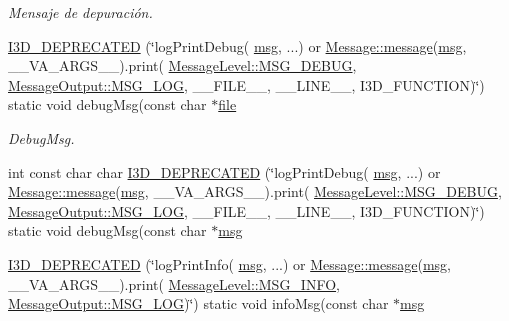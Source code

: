 \begin{DoxyCompactItemize}
\begin{DoxyCompactList}\small\item\em Mensaje de depuración. \end{DoxyCompactList}\item 
\hyperlink{class_i3_d_1_1_log_msg_a17cce8fb482ad6bcfc0f3accd5d1a33b}{I3\+D\+\_\+\+D\+E\+P\+R\+E\+C\+A\+T\+ED} (\char`\"{}log\+Print\+Debug( \hyperlink{class_i3_d_1_1_log_msg_a5a1ceb27d9529de8eb9b3fc9377e178a}{msg}, ...) or \hyperlink{class_i3_d_1_1_message_a525f877a41a1e7493188b2b720d1d254}{Message\+::message}(\hyperlink{class_i3_d_1_1_log_msg_a5a1ceb27d9529de8eb9b3fc9377e178a}{msg}, \+\_\+\+\_\+\+V\+A\+\_\+\+A\+R\+G\+S\+\_\+\+\_\+).print( \hyperlink{namespace_i3_d_a994cd716e000a4023e180dcdb9b3a9c0a918e87a1f80863c7ee35bfa2c58cc41e}{Message\+Level\+::\+M\+S\+G\+\_\+\+D\+E\+B\+UG}, \hyperlink{namespace_i3_d_accba1eafa248ca79da818a0b72e60964a8c1a4761ebfadb227927517230ff7b02}{Message\+Output\+::\+M\+S\+G\+\_\+\+L\+OG}, \+\_\+\+\_\+\+F\+I\+L\+E\+\_\+\+\_\+, \+\_\+\+\_\+\+L\+I\+N\+E\+\_\+\+\_\+, I3\+D\+\_\+\+F\+U\+N\+C\+T\+I\+ON)\char`\"{}) static void debug\+Msg(const char $\ast$\hyperlink{class_i3_d_1_1_log_msg_ab59f20d39ef112d2196371ae0636d77c}{file}
\begin{DoxyCompactList}\small\item\em Debug\+Msg. \end{DoxyCompactList}\item 
int const char char \hyperlink{class_i3_d_1_1_log_msg_a4bb9bcc06243caa8745dd7e4dda702e0}{I3\+D\+\_\+\+D\+E\+P\+R\+E\+C\+A\+T\+ED} (\char`\"{}log\+Print\+Debug( \hyperlink{class_i3_d_1_1_log_msg_a5a1ceb27d9529de8eb9b3fc9377e178a}{msg}, ...) or \hyperlink{class_i3_d_1_1_message_a525f877a41a1e7493188b2b720d1d254}{Message\+::message}(\hyperlink{class_i3_d_1_1_log_msg_a5a1ceb27d9529de8eb9b3fc9377e178a}{msg}, \+\_\+\+\_\+\+V\+A\+\_\+\+A\+R\+G\+S\+\_\+\+\_\+).print( \hyperlink{namespace_i3_d_a994cd716e000a4023e180dcdb9b3a9c0a918e87a1f80863c7ee35bfa2c58cc41e}{Message\+Level\+::\+M\+S\+G\+\_\+\+D\+E\+B\+UG}, \hyperlink{namespace_i3_d_accba1eafa248ca79da818a0b72e60964a8c1a4761ebfadb227927517230ff7b02}{Message\+Output\+::\+M\+S\+G\+\_\+\+L\+OG}, \+\_\+\+\_\+\+F\+I\+L\+E\+\_\+\+\_\+, \+\_\+\+\_\+\+L\+I\+N\+E\+\_\+\+\_\+, I3\+D\+\_\+\+F\+U\+N\+C\+T\+I\+ON)\char`\"{}) static void debug\+Msg(const char $\ast$\hyperlink{class_i3_d_1_1_log_msg_a5a1ceb27d9529de8eb9b3fc9377e178a}{msg}
\item 
\hyperlink{class_i3_d_1_1_log_msg_aeda06127fe9f852a443b55d493132fb1}{I3\+D\+\_\+\+D\+E\+P\+R\+E\+C\+A\+T\+ED} (\char`\"{}log\+Print\+Info( \hyperlink{class_i3_d_1_1_log_msg_a5a1ceb27d9529de8eb9b3fc9377e178a}{msg}, ...) or \hyperlink{class_i3_d_1_1_message_a525f877a41a1e7493188b2b720d1d254}{Message\+::message}(\hyperlink{class_i3_d_1_1_log_msg_a5a1ceb27d9529de8eb9b3fc9377e178a}{msg}, \+\_\+\+\_\+\+V\+A\+\_\+\+A\+R\+G\+S\+\_\+\+\_\+).print( \hyperlink{namespace_i3_d_a994cd716e000a4023e180dcdb9b3a9c0ad5150815f57a5219a42da2f42f90861e}{Message\+Level\+::\+M\+S\+G\+\_\+\+I\+N\+FO}, \hyperlink{namespace_i3_d_accba1eafa248ca79da818a0b72e60964a8c1a4761ebfadb227927517230ff7b02}{Message\+Output\+::\+M\+S\+G\+\_\+\+L\+OG})\char`\"{}) static void info\+Msg(const char $\ast$\hyperlink{class_i3_d_1_1_log_msg_a5a1ceb27d9529de8eb9b3fc9377e178a}{msg}

\end{DoxyCompactItemize}
